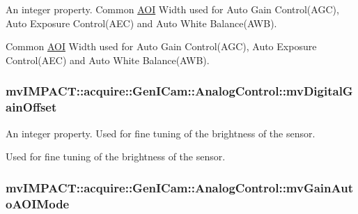 An integer property. Common \hyperlink{struct_a_o_i}{A\+O\+I} Width used for Auto Gain Control(\+A\+G\+C), Auto Exposure Control(\+A\+E\+C) and Auto White Balance(\+A\+W\+B). 

Common \hyperlink{struct_a_o_i}{A\+O\+I} Width used for Auto Gain Control(\+A\+G\+C), Auto Exposure Control(\+A\+E\+C) and Auto White Balance(\+A\+W\+B). \hypertarget{classmv_i_m_p_a_c_t_1_1acquire_1_1_gen_i_cam_1_1_analog_control_a23a2490c9258a2d20483ccc0f1674ec7}{
\subsubsection[{mv\+Digital\+Gain\+Offset}]{ mv\+I\+M\+P\+A\+C\+T\+::acquire\+::\+Gen\+I\+Cam\+::\+Analog\+Control\+::mv\+Digital\+Gain\+Offset}}\label{classmv_i_m_p_a_c_t_1_1acquire_1_1_gen_i_cam_1_1_analog_control_a23a2490c9258a2d20483ccc0f1674ec7}


An integer property. Used for fine tuning of the brightness of the sensor. 

Used for fine tuning of the brightness of the sensor. \hypertarget{classmv_i_m_p_a_c_t_1_1acquire_1_1_gen_i_cam_1_1_analog_control_a24072ac61d06cb5ea2dbc118fc4f1c3f}{
\subsubsection[{mv\+Gain\+Auto\+A\+O\+I\+Mode}]{ mv\+I\+M\+P\+A\+C\+T\+::acquire\+::\+Gen\+I\+Cam\+::\+Analog\+Control\+::mv\+Gain\+Auto\+A\+O\+I\+Mode}}\label{classmv_i_m_p_a_c_t_1_1acquire_1_1_gen_i_cam_1_1_analog_control_a24072ac61d06cb5ea2dbc118fc4f1c3f}


